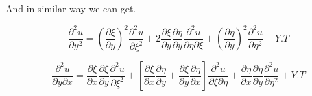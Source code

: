 \documentclass[]{article}
\begin{document}
And in similar way we can get.

\begin{equation}
\frac{\partial^2 u}{\partial y^2} = {(\frac{\partial\xi}{\partial y})}^2\frac{\partial^2 u}{\partial\xi^2}+2\frac{\partial\xi}{\partial y}\frac{\partial\eta}{\partial y}\frac{\partial^2 u}{\partial\eta\partial\xi}+{(\frac{\partial\eta}{\partial y})}^2\frac{\partial^2 u}{\partial\eta^2}+Y.T
\end{equation}

\begin{equation}
\frac{\partial^2 u}{\partial y\partial x} = \frac{\partial\xi}{\partial x}\frac{\partial\xi}{\partial y}\frac{\partial^2 u}{\partial\xi^2}+\left[\frac{\partial\xi}{\partial x}\frac{\partial\eta}{\partial y}+\frac{\partial\xi}{\partial y}\frac{\partial\eta}{\partial x}\right]\frac{\partial^2 u}{\partial\xi\partial\eta}+\frac{\partial\eta}{\partial x}\frac{\partial\eta}{\partial y}\frac{\partial^2 u}{\partial\eta^2} + Y.T
\end{equation}
\end{document}
